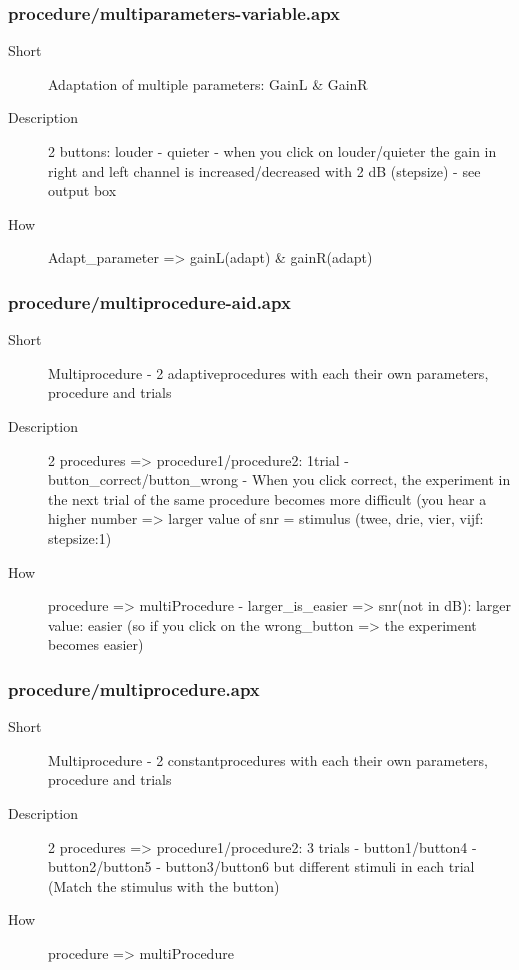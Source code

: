 \subsubsection{procedure/multiparameters-variable.apx}
\begin{description}
\item[Short] 
 Adaptation of multiple parameters: GainL \& GainR
\item[Description] 
 2 buttons: louder - quieter - when you click on louder/quieter the gain in right and left channel is increased/decreased with 2 dB (stepsize) - see output box
\item[How] 
 Adapt\_parameter =\textgreater{} gainL(adapt) \& gainR(adapt)
\end{description}

\subsubsection{procedure/multiprocedure-aid.apx}
\begin{description}
\item[Short] 
 Multiprocedure - 2 adaptiveprocedures with each their own parameters, procedure and trials
\item[Description] 
 2 procedures =\textgreater{} procedure1/procedure2: 1trial - button\_correct/button\_wrong - When you click correct, the experiment in the next trial of the same procedure becomes more difficult (you hear a higher number =\textgreater{} larger value of snr = stimulus (twee, drie, vier, vijf: stepsize:1)
\item[How] 
 procedure =\textgreater{} multiProcedure - larger\_is\_easier =\textgreater{} snr(not in dB): larger value: easier (so if you click on the wrong\_button =\textgreater{} the experiment becomes easier)
\end{description}

\subsubsection{procedure/multiprocedure.apx}
\begin{description}
\item[Short] 
 Multiprocedure - 2 constantprocedures with each their own parameters, procedure and trials
\item[Description] 
 2 procedures =\textgreater{} procedure1/procedure2: 3 trials - button1/button4 - button2/button5 - button3/button6 but different stimuli in each trial (Match the stimulus with the button)
\item[How] 
 procedure =\textgreater{} multiProcedure
\end{description}

